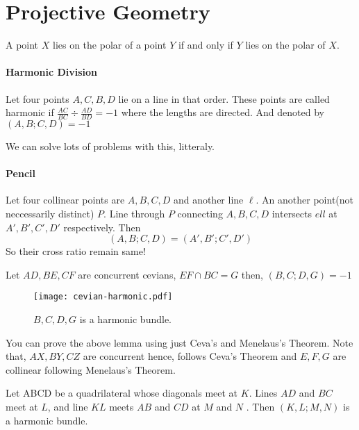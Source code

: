 \section{Projective Geometry}
\begin{theorem}
A point $X$ lies on the polar of a point $Y$ if and only if $Y$ lies on the polar of $X$.
\end{theorem}

\paragraph{Harmonic Division}
Let four points $A,C,B,D$ lie on a line in that order. These points are called harmonic if $\frac{AC}{BC} \div \frac{AD}{BD} =-1$ where the lengths are directed.
And denoted by $(A,B;C,D)=-1$ 

We can solve lots of problems with this, litteraly.

\paragraph{Pencil}
Let four collinear points are $A,B,C,D$ and another line $\ell$. An another point(not neccessarily distinct) $P$. Line through $P$ connecting $A,B,C,D$ intersects $ell$ at $A',B',C',D'$ respectively. Then 
\[(A,B;C,D)=(A',B';C',D')\]
So their cross ratio remain same!

\begin{lemma}
Let $AD,BE,CF$ are concurrent cevians, $EF\cap BC=G$ then, $(B,C;D,G)=-1$
\end{lemma}

\begin{figure}[h!t]
\centering
	\texttt{[image: cevian-harmonic.pdf]}
	\caption{$B,C,D,G$ is a harmonic bundle.}
\end{figure}
You can prove the above lemma using just Ceva's and Menelaus's Theorem.
Note that, $AX,BY,CZ$ are concurrent hence, follows Ceva's Theorem and $E,F,G$ are collinear following Menelaus's Theorem.



\begin{lemma} \label{lemma:com-har}
Let ABCD be 
a quadrilateral whose diagonals meet at $K$. Lines $AD$
 and $BC$ meet at $L$, and line $KL$ 
meets $AB$ and $CD$ at $M$ and $N$ . Then $(K, L; M, N)$
 is a harmonic bundle. 
\end{lemma}

